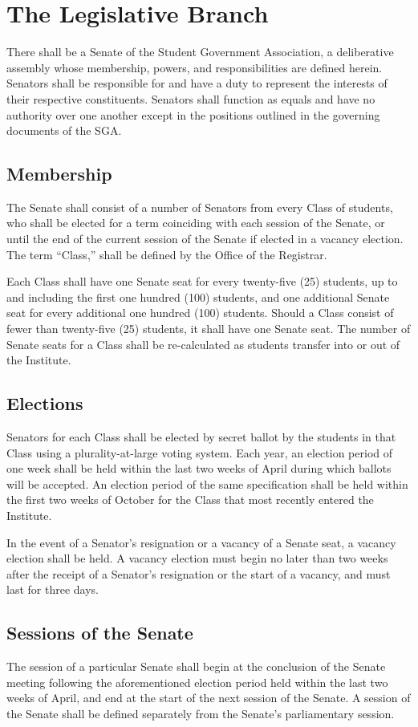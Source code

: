 \documentclass[12pt,oneside]{scrreprt}
\begin{document}
\chapter{The Legislative Branch}
There shall be a Senate of the Student Government Association, a deliberative assembly whose membership, powers, and responsibilities are defined herein. Senators shall be responsible for and have a duty to represent the interests of their respective constituents. Senators shall function as equals and have no authority over one another except in the positions outlined in the governing documents of the SGA.

\section{Membership}
The Senate shall consist of a number of Senators from every Class of students, who shall be elected for a term coinciding with each session of the Senate, or until the end of the current session of the Senate if elected in a vacancy election. The term ``Class,'' shall be defined by the Office of the Registrar.

Each Class shall have one Senate seat for every twenty-five (25) students, up to and including the first one hundred (100) students, and one additional Senate seat for every additional one hundred (100) students. Should a Class consist of fewer than twenty-five (25) students, it shall have one Senate seat. The number of Senate seats for a Class shall be re-calculated as students transfer into or out of the Institute.

\section{Elections}
Senators for each Class shall be elected by secret ballot by the students in that Class using a plurality-at-large voting system. Each year, an election period of one week shall be held within the last two weeks of April during which ballots will be accepted. An election period of the same specification shall be held within the first two weeks of October for the Class that most recently entered the Institute.

In the event of a Senator's resignation or a vacancy of a Senate seat, a vacancy election shall be held. A vacancy election must begin no later than two weeks after the receipt of a Senator's resignation or the start of a vacancy, and must last for three days.

\section{Sessions of the Senate}
The session of a particular Senate shall begin at the conclusion of the Senate meeting following the aforementioned election period held within the last two weeks of April, and end at the start of the next session of the Senate. A session of the Senate shall be defined separately from the Senate's parliamentary session.
\end{document}

